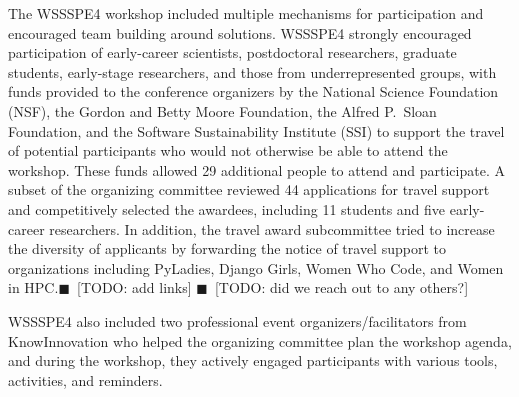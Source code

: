 \documentclass[11pt, oneside]{amsart}
\newcommand{\todo}[1]{{\color{blue}$\blacksquare$~\textsf{[TODO: #1]}}}
\begin{document}
The WSSSPE4 workshop included multiple mechanisms for participation and
encouraged team building around solutions. WSSSPE4 strongly encouraged participation
of early-career scientists, postdoctoral researchers, graduate students,
early-stage researchers, and those from underrepresented groups,
with funds provided to the conference organizers by the National Science
Foundation (NSF), the Gordon and Betty Moore Foundation, the Alfred P.~Sloan Foundation, and the Software
Sustainability Institute (SSI) to support the travel of potential participants
who would not otherwise be able to attend the workshop. These
funds allowed 29 additional people to attend and participate. A subset of the
organizing committee reviewed 44 applications for travel support and
competitively selected the awardees, including 11 students and five early-career
researchers. In addition, the travel award subcommittee tried to increase the
diversity of applicants by forwarding the notice of travel support to
organizations including PyLadies, Django Girls, Women Who Code, and
Women in HPC.\todo{add links}
\todo{did we reach out to any others?}

WSSSPE4 also included two professional event organizers/facilitators from
KnowInnovation who helped the organizing committee plan the workshop agenda,
and during the workshop, they actively engaged participants with various
tools, activities, and reminders.
\end{document}
